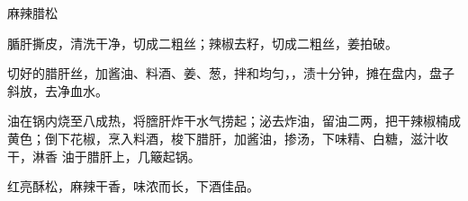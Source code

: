 \begin{recipe}{麻辣腊松}

\ingredients


\cooking

\step 腯肝撕皮，清洗干净，切成二粗丝；辣椒去籽，切成二粗丝，姜拍破。

\step 切好的腊肝丝，加酱油、料酒、姜、葱，拌和均匀，，渍十分钟，摊在盘内，盘子
斜放，去净血水。

\step 油在锅内烧至八成热，将膪肝炸干水气捞起；泌去炸油，留油二两，把干辣椒楠成
黄色；倒下花椒，烹入料酒，梭下腊肝，加酱油，掺汤，下味精、白糖，滋汁收干，淋香
油于腊肝上，几簸起锅。

\notes

红亮酥松，麻辣干香，味浓而长，下酒佳品。

\end{recipe}

